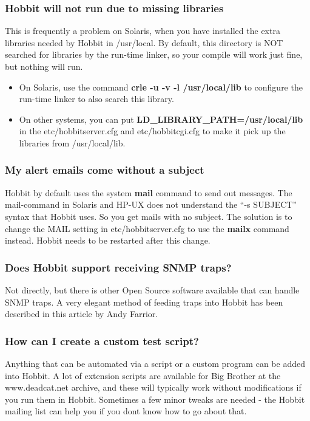 \subsubsection{Hobbit will not run due to missing libraries}


 This is frequently a problem on Solaris, when you have installed the extra libraries needed by Hobbit in /usr/local. By default, this directory is NOT searched for libraries by the run-time linker, so your compile will work just fine, but nothing will run. \begin{itemize}
\item On Solaris, use the command \textbf{crle -u -v -l /usr/local/lib}
 to configure the run-time linker to also search this library.
\item On other systems, you can put \textbf{LD\_LIBRARY\_PATH=/usr/local/lib}
 in the etc/hobbitserver.cfg and etc/hobbitcgi.cfg to make it pick up the libraries from /usr/local/lib.

\end{itemize}

 
\subsubsection{My alert emails come without a subject}


 Hobbit by default uses the system \textbf{mail}
 command to send out messages. The mail-command in Solaris and HP-UX does not understand the ``-s SUBJECT'' syntax that Hobbit uses. So you get mails with no subject. The solution is to change the MAIL setting in etc/hobbitserver.cfg to use the \textbf{mailx}
 command instead. Hobbit needs to be restarted after this change.
 
\subsubsection{Does Hobbit support receiving SNMP traps?}


 Not directly, but there is other Open Source software available that can handle SNMP traps. A very elegant method of feeding traps into Hobbit has been described in this article by Andy Farrior.
 
\subsubsection{How can I create a custom test script?}


 Anything that can be automated via a script or a custom program can be added into Hobbit. A lot of extension scripts are available for Big Brother at the www.deadcat.net archive, and these will typically work without modifications if you run them in Hobbit. Sometimes a few minor tweaks are needed - the Hobbit mailing list can help you if you dont know how to go about that.


